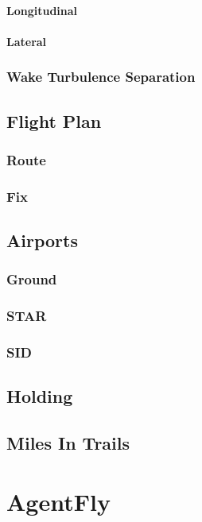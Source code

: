 \subsubsection{Longitudinal}
\subsubsection{Lateral}
\subsection{Wake Turbulence Separation}

\section{Flight Plan}
\subsection{Route}
\subsection{Fix}

\section{Airports}
\subsection{Ground}
\subsection{STAR}
\subsection{SID}

\section{Holding}

\section{Miles In Trails}






\chapter{AgentFly}

